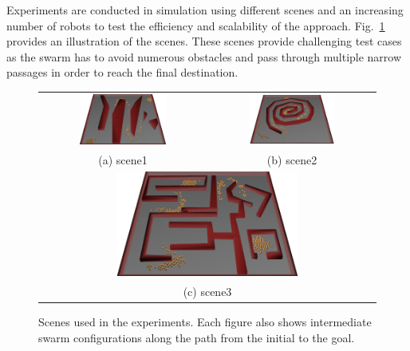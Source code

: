 \documentclass[letterpaper, 10pt, conference]{ieeeconf}
\begin{document}
Experiments are conducted in simulation using different scenes and an
increasing number of robots to test the efficiency and scalability of
the approach. Fig.~\ref{fig:Scenes} provides an illustration of the
scenes. These scenes provide challenging test cases as the swarm has
to avoid numerous obstacles and pass through multiple narrow passages
in order to reach the final destination.

\begin{figure}
\begin{tabular}{cc}
\includegraphics[width=0.55\textwidth]{figs/m7}&
\includegraphics[width=0.55\textwidth]{figs/scene1}\\
(a) scene1 & (b) scene2\\
\multicolumn{2}{c}{\includegraphics[width=0.55\textwidth]{figs/scene2}}\\
\multicolumn{2}{c}{(c) scene3}
\end{tabular}
\caption{Scenes used in the experiments. Each figure also shows
  intermediate swarm configurations along the path from the initial to
the goal.} 
\label{fig:Scenes}
\end{figure}
\end{document}
